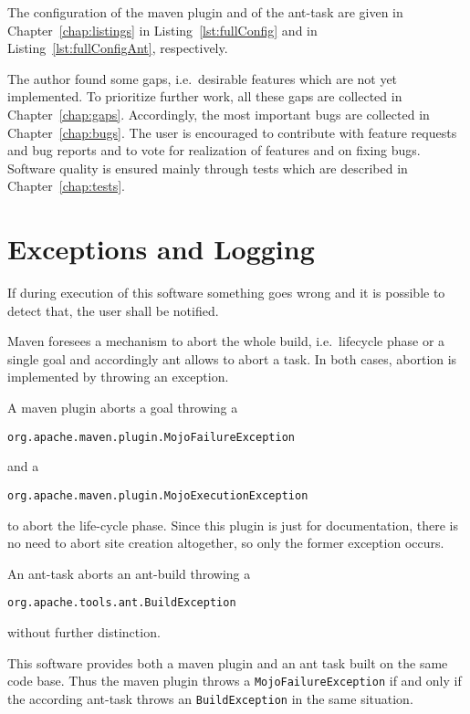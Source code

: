 \documentclass[12pt]{book}
\begin{document}
The configuration of the maven plugin and of the ant-task 
are given in Chapter~\ref{chap:listings}
in Listing~\ref{lst:fullConfig} and in Listing~\ref{lst:fullConfigAnt},
respectively. 

The author found some gaps, i.e.~desirable features 
which are not yet implemented. 
To prioritize further work, 
all these gaps are collected in Chapter~\ref{chap:gaps}. 
Accordingly, the most important bugs are collected in
Chapter~\ref{chap:bugs}. 
The user is encouraged to contribute with feature requests 
and bug reports and to vote for realization of features 
and on fixing bugs. 
Software quality is ensured mainly through tests 
which are described in Chapter~\ref{chap:tests}. 









\chapter{Exceptions and Logging}\label{chap:exceptionLogging}

If during execution of this software something goes wrong 
and it is possible to detect that, the user shall be notified. 

Maven foresees a mechanism to abort the whole build, i.e.~lifecycle phase 
or a single goal and accordingly ant allows to abort a task. 
In both cases, abortion is implemented by throwing an exception. 


A maven plugin aborts a goal throwing a 
%
\begin{verbatim}
org.apache.maven.plugin.MojoFailureException
\end{verbatim}
%
and a 
%
\begin{verbatim}
org.apache.maven.plugin.MojoExecutionException 
\end{verbatim}
%
to abort the life-cycle phase. 
Since this plugin is just for documentation, 
there is no need to abort site creation altogether, 
so only the former exception occurs. 

An ant-task aborts an ant-build throwing a
%
\begin{verbatim}
org.apache.tools.ant.BuildException
\end{verbatim}
%
without further distinction. 

This software provides both a maven plugin and an ant task 
built on the same code base. 
Thus the maven plugin throws a \texttt{MojoFailureException} 
if and only if the according ant-task throws an \texttt{BuildException} 
in the same situation. 
\end{document}
